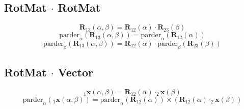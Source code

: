 \documentclass{article}
\newcommand{\bs}[1]{\boldsymbol #1}
\begin{document}
\subsection{RotMat $\cdot$ RotMat}
\begin{equation}
  \bs{R}_{13}(\alpha,\beta) = \bs{R}_{12}(\alpha) \cdot \bs{R}_{23}(\beta)
\end{equation}
\vspace{0em}
\begin{equation}
  \text{parder}_{\alpha}(\bs{R}_{13}(\alpha,\beta)) = \text{parder}_{\alpha}(\bs{R}_{12}(\alpha))
\end{equation}
\begin{equation}
  \text{parder}_{\beta}(\bs{R}_{13}(\alpha,\beta)) = \bs{R}_{12}(\alpha) \cdot \text{parder}_{\beta}(\bs{R}_{23}(\beta))
\end{equation}

\subsection{RotMat $\cdot$ Vector}
\begin{equation}
  _1\bs{x}(\alpha,\beta) = \bs{R}_{12}(\alpha) \cdot _2\bs{x}(\beta)
\end{equation}
\vspace{0em}
\begin{equation}
  \text{parder}_{\alpha}(_1\bs{x}(\alpha,\beta)) = \text{parder}_{\alpha}(\bs{R}_{12}(\alpha)) \times \left( \bs{R}_{12}(\alpha)\cdot _2\bs{x}(\beta) \right)
\end{equation}
\end{document}
